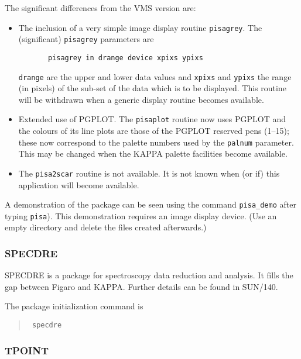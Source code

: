 The significant differences from the VMS version are:
\begin{itemize}
\item The inclusion of a very simple image display routine {\tt pisagrey}.
       The (significant) {\tt pisagrey} parameters are
\begin{verbatim}
       pisagrey in drange device xpixs ypixs
\end{verbatim}
       {\tt drange} are the upper and lower data values and {\tt xpixs} and
       {\tt ypixs}
       the range (in pixels) of the sub-set of the data which is to be
       displayed. This routine will be withdrawn when a generic
       display routine becomes available.

\item Extended use of PGPLOT. The {\tt pisaplot} routine now uses PGPLOT and
       the colours of its line plots are those of the PGPLOT reserved
       pens (1--15); these now correspond to the palette numbers
       used by the {\tt palnum} parameter. This may be changed when the KAPPA
       palette facilities become available.

\item The {\tt pisa2scar} routine is not available. It is not known when
       (or if) this application will become available.

\end{itemize}


A demonstration of the package can be seen using the command
{\tt pisa\_demo} after typing {\tt pisa}).
This demonstration requires an image display device.
(Use an empty directory and delete the files created afterwards.)

\subsubsection{SPECDRE}

SPECDRE is a package for spectroscopy data reduction and analysis.
It fills the gap between Figaro and KAPPA. Further details can be
found in SUN/140.

The package initialization command is

\begin{quote}\tt
specdre
\end{quote}


\subsubsection{TPOINT}

